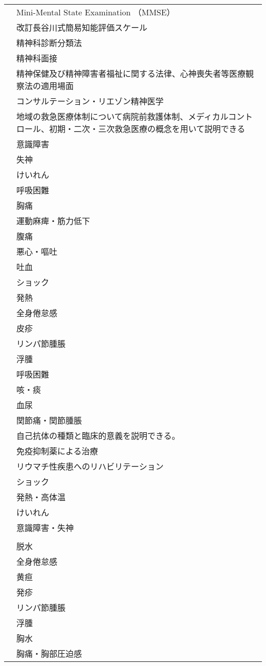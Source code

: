 \begin{xltabular}{\linewidth}{XX}
 & Mini-Mental State Examination （MMSE） \\
 & 改訂長谷川式簡易知能評価スケール \\
 & 精神科診断分類法 \\
 & 精神科面接 \\
 & 精神保健及び精神障害者福祉に関する法律、心神喪失者等医療観察法の適用場面 \\
 & コンサルテーション・リエゾン精神医学 \\
 & 地域の救急医療体制について病院前救護体制、メディカルコントロール、初期・二次・三次救急医療の概念を用いて説明できる \\
 & 意識障害 \\
 & 失神 \\
 & けいれん \\
 & 呼吸困難 \\
 & 胸痛 \\
 & 運動麻痺・筋力低下 \\
 & 腹痛 \\
 & 悪心・嘔吐 \\
 & 吐血 \\
 & ショック \\
 & 発熱 \\
 & 全身倦怠感 \\
 & 皮疹 \\
 & リンパ節腫脹 \\
 & 浮腫 \\
 & 呼吸困難 \\
 & 咳・痰 \\
 & 血尿 \\
 & 関節痛・関節腫脹 \\
 & 自己抗体の種類と臨床的意義を説明できる。 \\
 & 免疫抑制薬による治療 \\
 & リウマチ性疾患へのリハビリテーション \\
 & ショック \\
 & 発熱・高体温 \\
 & けいれん \\
 & 意識障害・失神 \\
 &  \\
 & 脱水 \\
 & 全身倦怠感 \\
 & 黄疸 \\
 & 発疹 \\
 & リンパ節腫脹 \\
 & 浮腫 \\
 & 胸水 \\
 & 胸痛・胸部圧迫感 \\

\end{xltabular}
